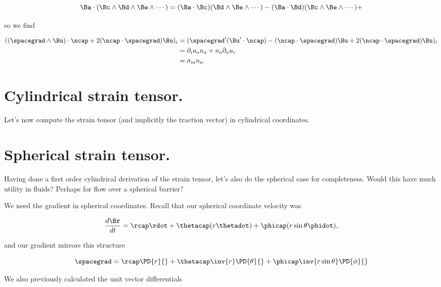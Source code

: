 \begin{equation}\label{eqn:stressTensorVectorForm:70}
\Ba \cdot (\Bc \wedge \Bd \wedge \Be \wedge \cdots )
=
(\Ba \cdot \Bc) (\Bd \wedge \Be \wedge \cdots ) - (\Ba \cdot \Bd) (\Bc \wedge \Be \wedge \cdots ) +
\end{equation}

so we find

\begin{align*}
((\spacegrad \wedge \Bu) \cdot \ncap + 2 (\ncap \cdot \spacegrad) \Bu
)_i
&=
(
\spacegrad' (\Bu' \cdot \ncap)
-
(\ncap \cdot \spacegrad) \Bu
+ 2 (\ncap \cdot \spacegrad) \Bu
)_i \\
&=
\partial_i u_a n_a
+
n_a \partial_a u_i \\
&=
\sigma_{ia} n_a.
\end{align*}

\section{Cylindrical strain tensor.}

Let's now compute the strain tensor (and implicitly the traction vector) in cylindrical coordinates.

\section{Spherical strain tensor.}

Having done a first order cylindrical derivation of the strain tensor, let's also do the spherical case for completeness.  Would this have much utility in fluids?  Perhaps for flow over a spherical barrier?

We need the gradient in spherical coordinates.  Recall that our spherical coordinate velocity was

\begin{equation}\label{eqn:stressTensorVectorForm:90}
\frac{d\Br}{dt} = \rcap \rdot + \thetacap (r \thetadot) + \phicap ( r \sin\theta \phidot ),
\end{equation}

and our gradient mirrors this structure

\begin{equation}\label{eqn:stressTensorVectorForm:110}
\spacegrad = \rcap \PD{r}{} + \thetacap \inv{r }\PD{\theta}{} + \phicap \inv{r \sin\theta} \PD{\phi}{}
\end{equation}

We also previously calculated  the unit vector differentials

